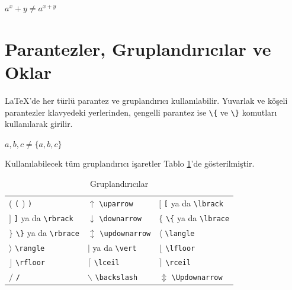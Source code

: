 \documentclass[
  10pt,
]{scrbook}
\newenvironment{Shaded}{\begin{snugshade}}{\end{snugshade}}
\newcommand{\SpecialCharTok}[1]{\textcolor[rgb]{0.00,0.00,0.00}{#1}}
\newcommand{\SpecialStringTok}[1]{\textcolor[rgb]{0.31,0.60,0.02}{#1}}
\theoremstyle{definition}
\theoremstyle{definition}
\theoremstyle{definition}
\theoremstyle{definition}
\theoremstyle{remark}
\begin{document}
\begin{Shaded}
\end{Shaded}

\(a^x+y \neq a^{x+y}\)

\hypertarget{parantezler-gruplandux131rux131cux131lar-ve-oklar}{%
\section{Parantezler, Gruplandırıcılar ve Oklar}\label{parantezler-gruplandux131rux131cux131lar-ve-oklar}}

LaTeX'de her türlü parantez ve gruplandırıcı kullanılabilir. Yuvarlak ve köşeli parantezler klavyedeki yerlerinden, çengelli parantez ise \texttt{\textbackslash{}\{} ve \texttt{\textbackslash{}\}} komutları kullanılarak girilir.

\begin{Shaded}
\end{Shaded}

\({a,b,c}\neq\{a,b,c\}\)

Kullanılabilecek tüm gruplandırıcı işaretler Tablo \ref{tab:grup}'de gösterilmiştir.

\begin{longtable}[]{@{}
  >{\raggedright\arraybackslash}p{}
  >{\raggedright\arraybackslash}p{}
  >{\raggedright\arraybackslash}p{}@{}}
\caption{\label{tab:grup} Gruplandırıcılar}\tabularnewline
\toprule
\endhead
( \texttt{(} ) \texttt{)} & \(\uparrow\) \texttt{\textbackslash{}uparrow} & \([\) \texttt{{[}} ya da \texttt{\textbackslash{}lbrack} \\
\(]\) \texttt{{]}} ya da \texttt{\textbackslash{}rbrack} & \(\downarrow\) \texttt{\textbackslash{}downarrow} & \(\lbrace\) \texttt{\textbackslash{}\{} ya da \texttt{\textbackslash{}lbrace} \\
\(\rbrace\) \texttt{\textbackslash{}\}} ya da \texttt{\textbackslash{}rbrace} & \(\updownarrow\) \texttt{\textbackslash{}updownarrow} & \(\langle\) \texttt{\textbackslash{}langle} \\
\(\rangle\) \texttt{\textbackslash{}rangle} & \(\vert\) \texttt{\textbar{}} ya da \texttt{\textbackslash{}vert} & \(\lfloor\) \texttt{\textbackslash{}lfloor} \\
\(\rfloor\) \texttt{\textbackslash{}rfloor} & \(\lceil\) \texttt{\textbackslash{}lceil} & \(\rceil\) \texttt{\textbackslash{}rceil} \\
\(/\) \texttt{/} & \(\backslash\) \texttt{\textbackslash{}backslash} & \(\Updownarrow\) \texttt{\textbackslash{}Updownarrow} \\
\bottomrule
\end{longtable}
\end{document}
